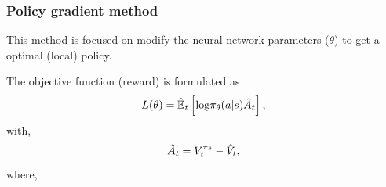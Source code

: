 \begin{frame}
	\frametitle{Policy gradient method}
	This method is focused on modify the neural network parameters  ($\theta$) to get a optimal {\color{gray} (local)} policy\footnotemark[1].

	\begin{center}
		\begin{minipage}{8cm}
			\begin{myexampleblock}[8cm]{}
				The objective function {\color{gray} (reward)} is formulated as\footnotemark[1]				
				\begin{equation*}
					L(\theta) = \hat{\mathbb{E}}_{t} \left[ \mathrm{log} \pi_\theta (a|s) \hat{A}_{t}  \right],			
				\end{equation*}
				with,
				\begin{equation*}
					\hat{A}_{t} = V^{\pi_{\theta}}_{t}  - \hat{V}_{t}, 
				\end{equation*}
				where,
				\newline
				\hspace{10px}
			\end{myexampleblock}
		\end{minipage}
	\end{center}
\end{frame}

